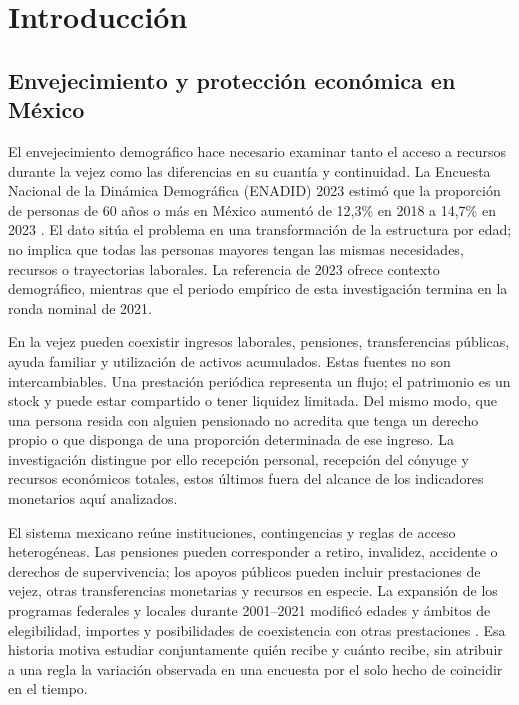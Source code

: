 \chapter{Introducción}
\label{cap:introduccion}

\section{Envejecimiento y protección económica en México}
\label{sec:problema-proteccion}

El envejecimiento demográfico hace necesario examinar tanto el acceso a recursos
durante la vejez como las diferencias en su cuantía y continuidad. La Encuesta
Nacional de la Dinámica Demográfica (ENADID) 2023 estimó que la proporción
de personas de 60 años o más en México aumentó
de 12,3\% en 2018 a 14,7\% en 2023 \citep[p.~2]{inegi2024enadid}.
El dato sitúa el problema en una transformación de la estructura por edad;
no implica que todas las personas mayores tengan las mismas necesidades,
recursos o trayectorias laborales. La referencia de 2023 ofrece contexto
demográfico, mientras que el periodo empírico de esta investigación termina
en la ronda nominal de 2021.

En la vejez pueden coexistir ingresos laborales, pensiones, transferencias
públicas, ayuda familiar y utilización de activos acumulados. Estas fuentes
no son intercambiables. Una prestación periódica representa un flujo; el
patrimonio es un stock y puede estar compartido o tener liquidez limitada.
Del mismo modo, que una persona resida con alguien pensionado no acredita
que tenga un derecho propio o que disponga de una proporción determinada de
ese ingreso. La investigación distingue por ello recepción personal,
recepción del cónyuge y recursos económicos totales, estos últimos fuera del
alcance de los indicadores monetarios aquí analizados.

El sistema mexicano reúne instituciones, contingencias y reglas de acceso
heterogéneas. Las pensiones pueden corresponder a retiro, invalidez,
accidente o derechos de supervivencia; los apoyos públicos pueden incluir
prestaciones de vejez, otras transferencias monetarias y recursos en especie.
La expansión de los programas federales y locales durante 2001--2021 modificó
edades y ámbitos de elegibilidad, importes y posibilidades de coexistencia
con otras prestaciones \citep{setentamas2007,setentamas2012,pam2013,
pam2014,bienestar2019,bienestar2021b}. Esa historia motiva estudiar conjuntamente
quién recibe y cuánto recibe, sin atribuir a una regla la variación observada
en una encuesta por el solo hecho de coincidir en el tiempo.

